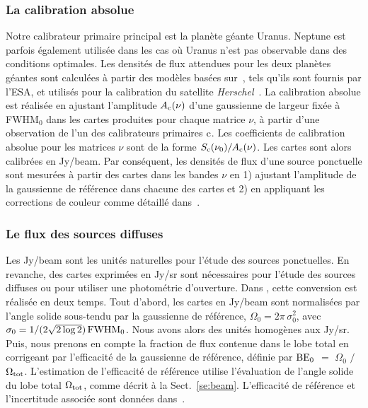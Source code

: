 \subsubsection{La calibration absolue}
Notre calibrateur primaire principal est la planète géante
Uranus. Neptune est parfois également utilisée dans les cas où Uranus
n'est pas observable dans des conditions optimales. Les densités de
flux attendues pour les deux planètes géantes sont calculées à partir
des modèles basées sur~\citet{Morenothesis}, tels qu'ils sont fournis par
l'ESA, et utilisés pour la calibration du satellite
\emph{Herschel}~\citep{Bendo2013}. La calibration absolue est réalisée
en ajustant l'amplitude $A_{\rm{c}}(\nu)$ d'une gaussienne de largeur
fixée à FWHM$_0$ dans les cartes produites pour chaque matrice $\nu$,
à partir d'une observation de l'un des calibrateurs primaires
$\rm{c}$. Les coefficients de calibration absolue pour les matrices
$\nu$ sont de la forme $S_{\rm{c}}(\nu_0) / A_{\rm{c}}(\nu)$. Les
cartes sont alors calibrées en Jy/beam. Par conséquent, les densités
de flux d'une source ponctuelle sont mesurées à partir des cartes dans
les bandes $\nu$ en 1) ajustant l'amplitude de la gaussienne de
référence dans chacune des cartes et 2) en appliquant les corrections
de couleur comme détaillé dans~\citet{Perotto2019}.

\subsubsection{Le flux des sources diffuses}

Les Jy/beam sont les unités naturelles pour l'étude des sources
ponctuelles. En revanche, des cartes exprimées en Jy/sr sont
nécessaires pour l'étude des sources diffuses ou pour utiliser une
photométrie d'ouverture. 
Dans \citet{Perotto2019}, cette conversion est réalisée en deux
temps. Tout d'abord, les cartes en Jy/beam sont normalisées
par l'angle solide sous-tendu par la gaussienne de référence,
$\Omega_0 = 2\pi \, \sigma_0^2$, avec $\sigma_0 = 1/(2\sqrt{2
  \log{2}})\, \rm{FWHM}_0$. Nous avons alors des unités homogènes aux
Jy/sr. Puis, nous prenons en compte la fraction de flux contenue dans
le lobe total en corrigeant par l'efficacité de la gaussienne de
référence, définie par $\rm{BE}_{0}$ $=$ $\Omega_{0}$ $/$ $\Omega_{\rm{tot}}$.
L'estimation de l'efficacité de référence utilise l'évaluation de
l'angle solide du lobe total $\Omega_{\rm{tot}}$, comme décrit à la
Sect.~\ref{se:beam}. L'efficacité de référence et l'incertitude
associée sont données dans~\citet{Perotto2019}.


